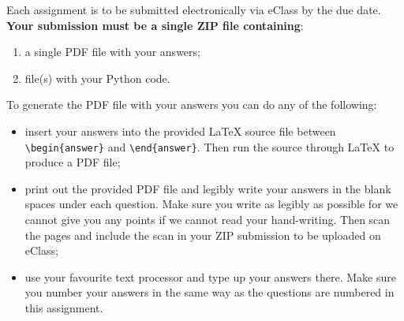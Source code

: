\documentclass{article}
\begin{document}
\medskip

Each assignment is to be submitted electronically via eClass by the due date.
\textbf{Your submission must be a single ZIP file containing}: 
\begin{enumerate}
    \item a single PDF file with your answers;
    \item file(s) with your Python code.
\end{enumerate}

To generate the PDF file with your answers you can do any of the following:

\begin{itemize}
    \item
    insert your answers into the provided \LaTeX{} source file between \verb|\begin{answer}| and \verb|\end{answer}|. Then run the source through \LaTeX{} to produce a PDF file;

    \item print out the provided PDF file and legibly write your answers in the blank spaces under each question. Make sure you write as legibly as possible for we cannot give you any points if we cannot read your hand-writing. Then scan the pages and include the scan in your ZIP submission to be uploaded on eClass;

    \item use your favourite text processor and type up your answers there. Make sure you number your answers in the same way as the questions are numbered in this assignment.
\end{itemize}

%
%
\end{document}
